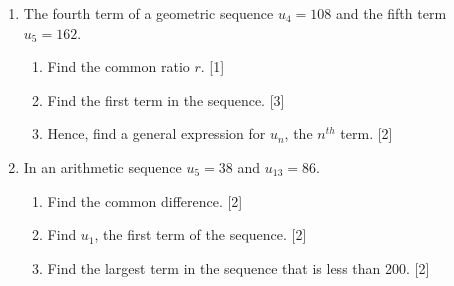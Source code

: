 \documentclass[12pt, twoside]{article}
\begin{document}
\begin{enumerate}[itemsep=0.5cm]
\newpage
\item The fourth term of a geometric sequence $u_4=108$ and the fifth term $u_5=162$.
    \begin{enumerate}[itemsep=0.25cm]
        \item Find the common ratio $r$. \hfill [1]
        \item Find the first term in the sequence. \hfill [3]
        \item Hence, find a general expression for $u_n$, the $n^{th}$ term.  \hfill [2]
    \end{enumerate}
    
\newpage
\item In an arithmetic sequence $u_5=38$ and $u_{13}=86$.
    \begin{enumerate}[itemsep=0.25cm]
        \item Find the common difference. \hfill [2]
        \item Find $u_1$, the first term of the sequence.  \hfill [2]
        \item Find the largest term in the sequence that is less than 200. \hfill [2]
    \end{enumerate}
    
\newpage

\end{enumerate}
\end{document}

